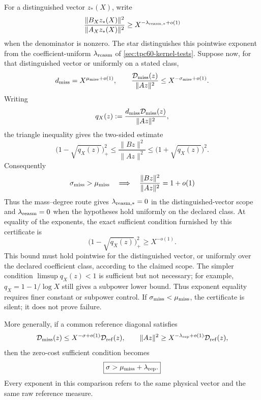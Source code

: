 For a distinguished vector \(z_*(X)\), write
\begin{equation}
 \frac{\|B_Xz_*(X)\|^2}{\|A_Xz_*(X)\|^2}
 \ge X^{-\lambda_{\rm reasm,*}+o(1)}
 \label{eq:tpc60-pointwise-reassembly-exponent}
\end{equation}
when the denominator is nonzero.  The star distinguishes this pointwise
exponent from the coefficient-uniform \(\lambda_{\rm reasm}\) of
\cref{sec:tpc60-kernel-tests}.  Suppose now, for that distinguished vector
or uniformly on a stated class,
\begin{equation}
 d_{\rm miss}=X^{\mu_{\rm miss}+o(1)},
 \qquad
 \frac{\mathcal D_{\rm miss}(z)}{\|Az\|^2}
 \le X^{-\sigma_{\rm miss}+o(1)}.
 \label{eq:tpc60-degree-saving-exponents}
\end{equation}
Writing
\begin{equation}
 q_X(z):=
 \frac{d_{\rm miss}\mathcal D_{\rm miss}(z)}{\|Az\|^2},
 \label{eq:tpc60-qX-product}
\end{equation}
the triangle inequality gives the two-sided estimate
\begin{equation}
 \bigl(1-\sqrt{q_X(z)}\bigr)_+^2
 \le\frac{\|Bz\|^2}{\|Az\|^2}
 \le\bigl(1+\sqrt{q_X(z)}\bigr)^2.
 \label{eq:tpc60-qX-two-sided}
\end{equation}
Consequently
\begin{equation}
 \sigma_{\rm miss}>\mu_{\rm miss}
 \quad\Longrightarrow\quad
 \frac{\|Bz\|^2}{\|Az\|^2}=1+o(1)
 \label{eq:tpc60-zero-cost-exponent-condition}
\end{equation}
Thus the mass--degree route gives \(\lambda_{\rm reasm,*}=0\) in the
distinguished-vector scope and \(\lambda_{\rm reasm}=0\) when the hypotheses
hold uniformly on the declared class.  At equality of the exponents, the exact
sufficient condition furnished by this certificate is
\begin{equation}
 \bigl(1-\sqrt{q_X(z)}\bigr)_+^2\ge X^{-o(1)}.
 \label{eq:tpc60-equality-subpower-test}
\end{equation}
This bound must hold pointwise for the distinguished vector, or uniformly over the
declared coefficient class, according to the claimed scope.
The simpler condition \(\limsup q_X(z)<1\) is sufficient but not
necessary; for example, \(q_X=1-1/\log X\) still gives a subpower lower
bound.  Thus exponent equality requires finer constant or subpower
control.  If
\(\sigma_{\rm miss}<\mu_{\rm miss}\), the certificate is silent; it does
not prove failure.

More generally, if a common reference diagonal satisfies
\begin{equation}
 \mathcal D_{\rm miss}(z)
 \le X^{-\sigma+o(1)}\mathcal D_{\rm ref}(z),
 \qquad
 \|Az\|^2
 \ge X^{-\lambda_{\rm rep}+o(1)}\mathcal D_{\rm ref}(z),
 \label{eq:tpc60-common-reference-bounds}
\end{equation}
then the zero-cost sufficient condition becomes
\begin{equation}
 \boxed{
 \sigma>\mu_{\rm miss}+\lambda_{\rm rep}.}
 \label{eq:tpc60-common-reference-threshold}
\end{equation}
Every exponent in this comparison refers to the same physical vector and
the same raw reference measure.
